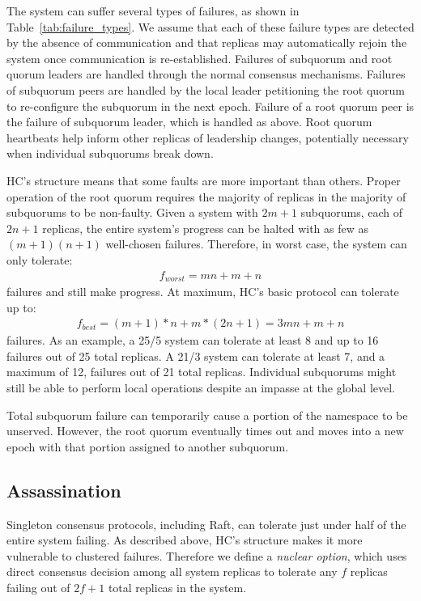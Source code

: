 \documentclass[10pt,conference]{IEEEtran}
\newcommand{\sub}{subquorum\xspace}
\newcommand{\subs}{subquorums\xspace}
\newcommand{\roo}{root quorum\xspace}
\newcommand{\Roo}{Root quorum\xspace}
\begin{document}
The system can suffer several types of failures, as shown in
Table~\ref{tab:failure_types}.
We assume that each of these failure types are detected by the absence of communication
and that replicas may automatically rejoin the system once communication is 
re-established.
Failures of \sub and \roo leaders are handled through the normal consensus
mechanisms.
Failures of \sub peers are handled by the local leader petitioning the \roo to
re-configure the \sub in the next epoch.
Failure of a \roo peer is the failure of \sub leader, which is handled as
above.
\Roo heartbeats help inform other replicas of leadership changes, potentially
necessary when individual \subs break down.

HC's structure means that some faults are more important than others.
Proper operation of the \roo requires the majority of replicas in the majority of \subs to
be non-faulty.
Given a system with $2m+1$ \subs, each of $2n+1$ replicas, the entire
system's progress can be halted with as few as $(m+1)(n+1)$ well-chosen
failures.
Therefore, in worst case, the system can only tolerate:
\begin{align*}
f_{worst}=mn+m+n
\end{align*}
failures and still make progress.
At maximum, HC's basic protocol can tolerate up to:
\begin{align*}
f_{best} = (m+1)*n + m*(2n+1) = 3mn+m+n
\end{align*}
failures.
As an example, a 25/5 system can tolerate at least 8 and
up to 16 failures out of 25 total replicas.
A 21/3 system can tolerate at least 7, and a maximum of 12,
failures out of 21 total replicas.
Individual \subs might
still be able to perform local operations despite an impasse at the global level.

Total \sub failure can temporarily cause a portion of the namespace to be unserved. However, the \roo
eventually times out and moves into a new epoch with that portion assigned to another
\sub.

\subsection{Assassination}
\label{section:assassination}

Singleton consensus protocols, including Raft, can tolerate just under half of the entire system
failing.
As described above, HC's structure makes it more vulnerable to clustered failures.
Therefore we define a \emph{nuclear option}, which uses direct consensus
decision among all system replicas to tolerate any $f$ replicas
failing out of $2f+1$ total replicas in the system.
\end{document}
